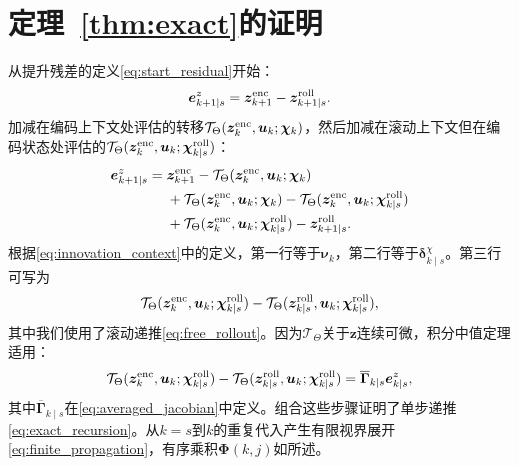 \documentclass[journal]{IEEEtran}
\newcommand{\1}{\bm 1}
\begin{document}
\appendices
\section{定理~\ref{thm:exact}的证明}
从提升残差的定义\eqref{eq:start_residual}开始：
\begin{equation*}
\bm e_{k+1\mid s}^z=\bm z_{k+1}^{\rm enc}-\bm z_{k+1\mid s}^{\rm roll}.
\end{equation*}
加减在编码上下文处评估的转移$\mathcal T_\Theta(\bm z_k^{\rm enc},\bm u_k;\bm\chi_k)$，然后加减在滚动上下文但在编码状态处评估的$\mathcal T_\Theta(\bm z_k^{\rm enc},\bm u_k;\bm\chi_{k\mid s}^{\rm roll})$：
\begin{equation*}
\begin{aligned}
\bm e_{k+1\mid s}^z={}&
\bm z_{k+1}^{\rm enc}
-\mathcal T_\Theta(\bm z_k^{\rm enc},\bm u_k;\bm\chi_k)\\
&+\mathcal T_\Theta(\bm z_k^{\rm enc},\bm u_k;\bm\chi_k)
-\mathcal T_\Theta(\bm z_k^{\rm enc},\bm u_k;\bm\chi_{k\mid s}^{\rm roll})\\
&+\mathcal T_\Theta(\bm z_k^{\rm enc},\bm u_k;\bm\chi_{k\mid s}^{\rm roll})
-\bm z_{k+1\mid s}^{\rm roll}.
\end{aligned}
\end{equation*}
根据\eqref{eq:innovation_context}中的定义，第一行等于$\bm\nu_k$，第二行等于$\bm\delta_{k\mid s}^{\chi}$。第三行可写为
\begin{equation*}
\mathcal T_\Theta(\bm z_k^{\rm enc},\bm u_k;\bm\chi_{k\mid s}^{\rm roll})
-\mathcal T_\Theta(\bm z_{k\mid s}^{\rm roll},\bm u_k;\bm\chi_{k\mid s}^{\rm roll}),
\end{equation*}
其中我们使用了滚动递推\eqref{eq:free_rollout}。因为$\mathcal T_\Theta$关于$\bm z$连续可微，积分中值定理适用：
\begin{equation*}
\mathcal T_\Theta(\bm z_k^{\rm enc},\bm u_k;\bm\chi_{k\mid s}^{\rm roll})
-\mathcal T_\Theta(\bm z_{k\mid s}^{\rm roll},\bm u_k;\bm\chi_{k\mid s}^{\rm roll})
=\overline{\bm\Gamma}_{k\mid s}\bm e_{k\mid s}^z,
\end{equation*}
其中$\overline{\bm\Gamma}_{k\mid s}$在\eqref{eq:averaged_jacobian}中定义。组合这些步骤证明了单步递推\eqref{eq:exact_recursion}。从$k=s$到$k$的重复代入产生有限视界展开\eqref{eq:finite_propagation}，有序乘积$\bm\Phi(k,j)$如所述。
\end{document}
